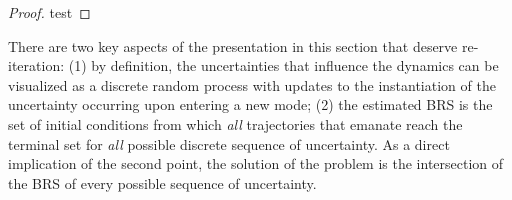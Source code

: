     \begin{proof}
      test
    \end{proof}
    \begin{remark}
    There are two key aspects of the presentation in this section that deserve re-iteration: (1) by definition, the uncertainties that influence the dynamics can be visualized as a discrete random process with updates to the instantiation of the uncertainty occurring upon entering a new mode; (2) the estimated BRS is the set of initial conditions from which {\em all} trajectories that emanate reach the terminal set for {\em all} possible discrete sequence of uncertainty. As a direct implication of the second point, the solution of the problem is the intersection of the BRS of every possible sequence of uncertainty.
    \end{remark}
